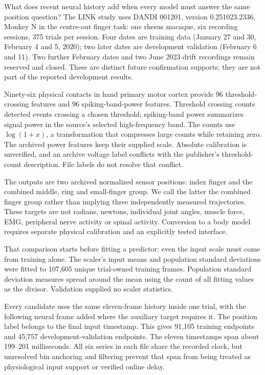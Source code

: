 What does recent neural history add when every model must answer the same position question? The LINK study uses DANDI 001201, version 0.251023.2336, Monkey N in the
centre-out finger task: one rhesus macaque, six recording sessions, 375 trials
per session.\citep{linkarchive} Four dates are training data (January 27 and
30, February 4 and 5, 2020); two later dates are development validation
(February 6 and 11). Two further February dates and two June 2023 drift
recordings remain reserved and closed. These are distinct future confirmation
supports; they are not part of the reported development results.

Ninety-six physical contacts in hand primary motor cortex provide 96
threshold-crossing features and 96 spiking-band-power features. Threshold crossing
counts detected events crossing a chosen threshold; spiking-band power summarizes
signal power in the source's selected high-frequency band. The counts use
$\log(1+x)$, a transformation that compresses large counts while retaining zero.
The archived power features keep their supplied scale. Absolute calibration is
unverified, and an archive voltage label conflicts with the publisher's
threshold-count description. File labels do not resolve that conflict.

The outputs are two archived normalized sensor positions: index finger and the
combined middle, ring and small-finger group. We call the latter the combined
finger group rather than implying three independently measured trajectories.
These targets are not radians, newtons, individual joint angles, muscle force,
EMG, peripheral nerve activity or spinal activity. Conversion to a body model
requires separate physical calibration and an explicitly tested interface.

That comparison starts before fitting a predictor: even the input scale must come from training alone. The scaler's input means and population standard deviations were fitted to 107,605 unique trial-owned training frames. Population standard deviation measures spread around the mean using the count of all fitting values as the divisor. Validation supplied no scaler statistics.

Every candidate uses the same eleven-frame history inside one trial, with the following neural frame added where the auxiliary target requires it. The position label belongs to the final input timestamp. This gives 91,105 training endpoints and 45,757 development-validation endpoints. The eleven timestamps span about 199--201 milliseconds. All six series in each file share the recorded clock, but unresolved bin anchoring and filtering prevent that span from being treated as physiological input support or verified online delay.

